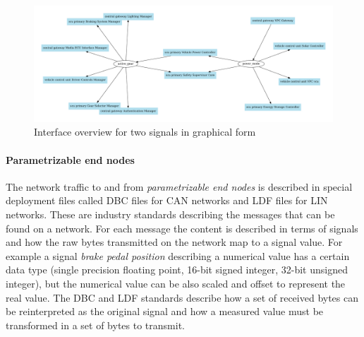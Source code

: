 \begin{figure}[htbp]
    \centering
    \includegraphics[width=\textwidth]{images/interface_overview.pdf}
    \caption{Interface overview for two signals in graphical form}
    \label{fig:interface_overview}
\end{figure}
\clearpage
\paragraph{Parametrizable end nodes}
The network traffic to and from \textit{parametrizable end nodes} is described in special deployment files called DBC files for CAN networks and LDF files for LIN networks. These are industry standards describing the messages that can be found on a network. For each message the content is described in terms of signals and how the raw bytes transmitted on the network map to a signal value. For example a signal \textit{brake pedal position} describing a numerical value has a certain data type (single precision floating point, 16-bit signed integer, 32-bit unsigned integer), but the numerical value can be also scaled and offset to represent the real value. The DBC and LDF standards describe how a set of received bytes can be reinterpreted as the original signal and how a measured value must be transformed in a set of bytes to transmit. 

